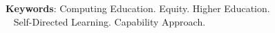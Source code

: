 \begin{resumo}[Abstract]
   \vspace{\onelineskip} 
 
   \noindent 
   \textbf{Keywords}: Computing Education. Equity. Higher Education. 
   \\ \mbox{ } \hspace{48pt} Self-Directed Learning. Capability Approach.
 \end{resumo}